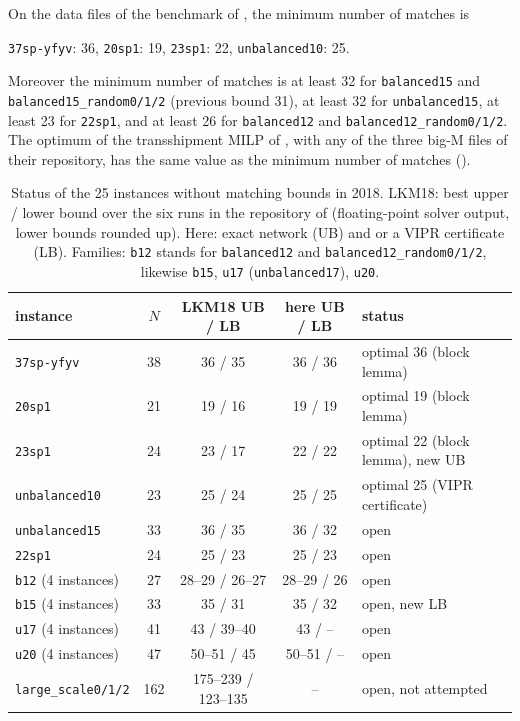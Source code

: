 \documentclass[11pt,a4paper]{report}
\newcommand*{\inst}[1]{\texttt{#1}}
\begin{document}
\begin{theorem}\label{thm:main}
On the data files of the benchmark of \textcite{LKM2018}, the minimum number of matches is
\begin{center}
\inst{37sp-yfyv}: 36, \qquad \inst{20sp1}: 19, \qquad \inst{23sp1}: 22, \qquad \inst{unbalanced10}: 25.
\end{center}
Moreover the minimum number of matches is at least 32 for \inst{balanced15} and \inst{balanced15\_random0/1/2}
(previous bound 31), at least 32 for \inst{unbalanced15}, at least 23 for \inst{22sp1}, and at least 26 for
\inst{balanced12} and \inst{balanced12\_random0/1/2}. The optimum of the transshipment MILP of
\textcite{LKM2018}, with any of the three big-M files of their repository, has the same value as the minimum number
of matches ().
\end{theorem}

\begin{table}[h]
\centering\footnotesize
\caption{Status of the 25 instances without matching bounds in 2018. LKM18: best upper / lower bound over the six
runs in the repository of \textcite{LKM2018} (floating-point solver output, lower bounds rounded up). Here: exact
network (UB) and  or a VIPR certificate (LB). Families: \inst{b12} stands for \inst{balanced12} and
\inst{balanced12\_random0/1/2}, likewise \inst{b15}, \inst{u17} (\inst{unbalanced17}), \inst{u20}.}\label{tab:status}
\setlength{\tabcolsep}{4pt}
\begin{tabular}{@{}lcccl@{}}
\toprule
instance & $N$ & LKM18 UB / LB & here UB / LB & status \\
\midrule
\inst{37sp-yfyv} & 38 & 36 / 35 & 36 / 36 & optimal 36 (block lemma) \\
\inst{20sp1} & 21 & 19 / 16 & 19 / 19 & optimal 19 (block lemma) \\
\inst{23sp1} & 24 & 23 / 17 & 22 / 22 & optimal 22 (block lemma), new UB \\
\inst{unbalanced10} & 23 & 25 / 24 & 25 / 25 & optimal 25 (VIPR certificate) \\
\inst{unbalanced15} & 33 & 36 / 35 & 36 / 32 & open \\
\inst{22sp1} & 24 & 25 / 23 & 25 / 23 & open \\
\inst{b12} (4 instances) & 27 & 28--29 / 26--27 & 28--29 / 26 & open \\
\inst{b15} (4 instances) & 33 & 35 / 31 & 35 / 32 & open, new LB \\
\inst{u17} (4 instances) & 41 & 43 / 39--40 & 43 / -- & open \\
\inst{u20} (4 instances) & 47 & 50--51 / 45 & 50--51 / -- & open \\
\inst{large\_scale0/1/2} & 162 & 175--239 / 123--135 & -- & open, not attempted \\
\bottomrule
\end{tabular}
\end{table}
\end{document}
